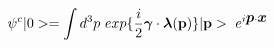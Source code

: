 \begin{equation}
\psi^{c} |0> = \int d^{3} p~ exp \{ \frac{i}{2} \mbox{\boldmath $\gamma$} \cdot \mbox{\boldmath 
$\lambda$}
({\bf p}) \} |{\bf p}> ~e^{i \mbox{\boldmath $p$} \cdot \mbox{\boldmath $x$}}
\end{equation}

